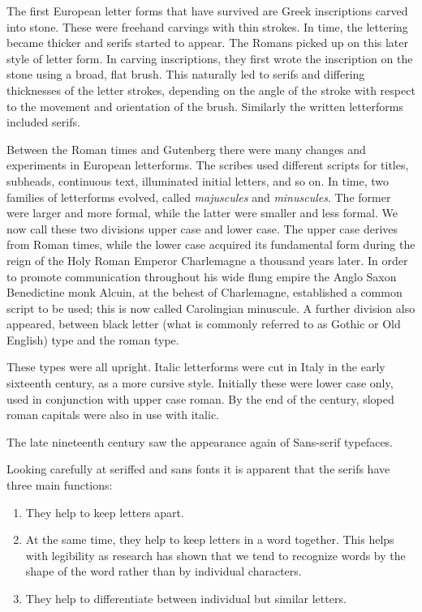 \documentclass[10pt,a4paper,extrafontsizes]{memoir}
\begin{document}
\begin{paracol}{2}
\switchEng
    The first European letter forms that have survived are Greek inscriptions
carved into stone. These were freehand carvings with thin strokes. In time,
the lettering became thicker and serifs started to appear. The Romans
picked up on this later style of letter form. In carving inscriptions, they
first wrote the inscription on the stone using a broad, flat brush. This
naturally led to serifs and differing thicknesses of the letter strokes,
depending on the angle of the stroke with respect to the movement and
orientation of the brush. Similarly the written letterforms included
serifs.

    Between the Roman times and Gutenberg there were many changes and
experiments in European letterforms. The scribes used different scripts
for titles, subheads, continuous text, illuminated initial letters, and so
on. In time, two families of letterforms evolved, 
called \emph{majuscules} and \emph{minuscules}. 
The former were larger and more formal, while the latter
were smaller and less formal. We now call these two divisions upper case and
lower case. The upper case derives from Roman times, while the lower case
acquired its fundamental form during the reign of the Holy Roman Emperor
Charlemagne a thousand years later. In order to 
promote communication
throughout his wide flung empire the Anglo Saxon Benedictine monk 
Alcuin, at the behest of Charlemagne, established a common
script to be used; this is now called Carolingian 
minuscule.
A further division also appeared, between black letter (what is
commonly referred to as Gothic or Old English) type and the roman type.

    These types were all upright. Italic letterforms were 
cut in Italy
in the early sixteenth century, as a more cursive style. Initially these were
lower case only, used in conjunction with upper case roman. By the end of
the century, sloped roman capitals were also in use with italic.

    The late nineteenth century saw the appearance again of 
Sans-serif
typefaces.

    Looking carefully at seriffed and sans fonts it is apparent that
the serifs have three main functions:
\begin{enumerate}
\item They help to keep letters apart.
\item At the same time, they help to keep letters in a word together. This
  helps with legibility as research has shown that 
  we tend to recognize
  words by the shape of the word rather than by individual characters.
\item They help to differentiate between individual but similar letters.
\end{enumerate}


\end{paracol}
\end{document}
